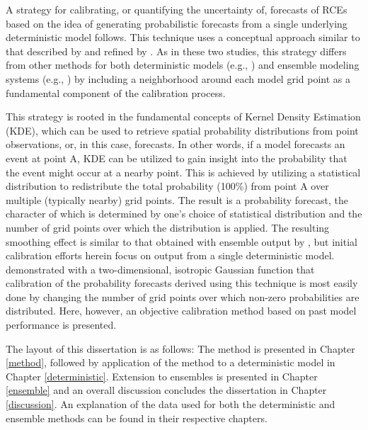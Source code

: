 A strategy for calibrating, or quantifying the uncertainty of, forecasts of RCEs based on the idea of generating probabilistic forecasts from a single underlying deterministic model follows.
This technique uses a conceptual approach similar to that described by \cite{Theis2005} and refined by \cite{Sobash2011}.
As in these two studies, this strategy differs from other methods for both deterministic models (e.g., \citealp{Glahn1972}) and ensemble modeling systems (e.g., \citealp{Hamill1998, Raftery2005, Clark2009, Glahn2009}) by including a neighborhood around each model grid point as a fundamental component of the calibration process.


This strategy is rooted in the fundamental concepts of Kernel Density Estimation (KDE), which can be used to retrieve spatial probability distributions from point observations, or, in this case, forecasts.
In other words, if a model forecasts an event at point A, KDE can be utilized to gain insight into the probability that the event might occur at a nearby point.
This is achieved by utilizing a statistical distribution to redistribute the total probability (100\%) from point A over multiple (typically nearby) grid points.
The result is a probability forecast, the character of which is determined by one's choice of statistical distribution and the number of grid points over which the distribution is applied.
The resulting smoothing effect is similar to that obtained with ensemble output by \cite{Wilks2002}, but initial calibration efforts herein focus on output from a single deterministic model.
\cite{Sobash2011} demonstrated with a two-dimensional, isotropic Gaussian function that calibration of the probability forecasts derived using this technique is most easily done by changing the number of grid points over which non-zero probabilities are distributed.
Here, however, an objective calibration method based on past model performance is presented.


The layout of this dissertation is as follows: The method is presented in Chapter \ref{method}, followed by application of the method to a deterministic model in Chapter \ref{deterministic}.
Extension to ensembles is presented in Chapter \ref{ensemble} and an overall discussion concludes the dissertation in Chapter \ref{discussion}.
An explanation of the data used for both the deterministic and ensemble methods can be found in their respective chapters.
